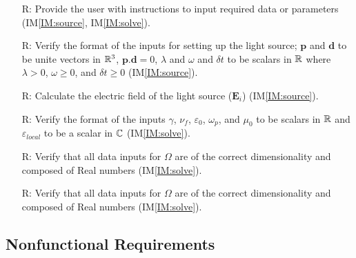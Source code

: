 \documentclass[12pt]{article}
\newcounter{reqnum} %
\begin{document}
	\noindent \begin{itemize}
		
		\item[R\refstepcounter{reqnum}\thereqnum \label{R_1}:] Provide the user
		with instructions to input required data or parameters (IM\ref{IM:source}, IM\ref{IM:solve}).
		
		\item[R\refstepcounter{reqnum}\thereqnum \label{R_2}:] Verify the
		format of the inputs for setting up the light source; $\textbf{p}$ and $\textbf{d}$ to be unite vectors in $\Bbb R^3$, $\textbf{p}\textbf{.}\textbf{d}=0$, $\lambda$ and $\omega$ and $\delta t$ to be scalars in $\Bbb R$ where $\lambda > 0$, $\omega \geqslant 0$, and $\delta t \geqslant 0$ (IM\ref{IM:source}).
		
		\item[R\refstepcounter{reqnum}\thereqnum \label{R_3}:] Calculate the
		electric field of the light source ($\textbf{E}_i$)
		(IM\ref{IM:source}).
		
		\item[R\refstepcounter{reqnum}\thereqnum \label{R_4}:] Verify
		the format of the inputs $\gamma$, $\nu_f$, $\varepsilon_0$, $\omega_p$, and
		$\mu_{0}$ to be scalars in $\Bbb R$ and $\varepsilon_{local}$ to be a scalar in
		$\Bbb C$ (IM\ref{IM:solve}).
		
		\item[R\refstepcounter{reqnum}\thereqnum \label{R_5}:]Verify that all data
		inputs for $\Omega$ are of the correct dimensionality and composed of Real
		numbers (IM\ref{IM:solve}).
		
		\item[R\refstepcounter{reqnum}\thereqnum \label{R_6}:] Verify that all data
		inputs for $\Omega$ are of the correct dimensionality and composed of Real
		numbers (IM\ref{IM:solve}).
		
		
		
	\end{itemize}
	
	\subsection{Nonfunctional Requirements}
	
\end{document}
